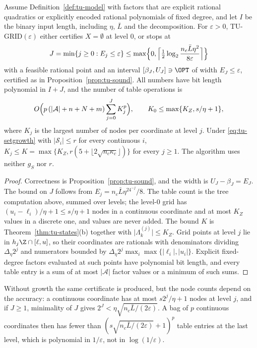 \begin{theorem}\label{thm:tu-approx}
Assume Definition~\ref{def:tu-model} with factors that are explicit rational
quadratics or explicitly encoded rational polynomials of fixed degree, and
let $I$ be the binary input length, including $\eta$, $\bar L$ and the
decomposition. For $\varepsilon>0$, TU-GRID$(\varepsilon)$ either certifies
$X=\emptyset$ at level $0$, or stops at
\[
J=\min\{j\ge0:E_j\le\varepsilon\}\le
\max\Bigl\{0,\Bigl\lceil\tfrac12\log_2\frac{n_c\bar L\eta^2}{8\varepsilon}\Bigr\rceil\Bigr\}
\]
with a feasible rational point and an interval $[\beta_J,U_J]\ni\OPT$ of width
$E_J\le\varepsilon$, certified as in Proposition~\ref{prop:tu-sound}. All
numbers have bit length polynomial in $I+J$, and the number of table
operations is
\[
O\Bigl(p\,(\lvert\mathcal A\rvert+n+N+m)\sum_{j=0}^JK_j^p\Bigr),\qquad
K_0\le\max\{K_Z,s/\eta+1\},
\]
where $K_j$ is the largest number of nodes per coordinate at level $j$.
Under \eqref{eq:tu-setgrowth} with $\lvert\mathcal S_i\rvert\le r$ for every
continuous $i$, $K_j\le K=\max\{K_Z,r(5+\lfloor2\sqrt{n_c\kappa_c}\rfloor)\}$
for every $j\ge1$. The algorithm uses neither $g_S$ nor $r$.
\end{theorem}

\begin{proof}
Correctness is Proposition~\ref{prop:tu-sound}, and the width is
$U_J-\beta_J=E_J$. The bound on $J$ follows from $E_j=n_c\bar L\eta^24^{-j}/8$.
The table count is the tree computation above, summed over levels; the
level-$0$ grid has $(u_i-\ell_i)/\eta+1\le s/\eta+1$ nodes in a continuous
coordinate and at most $K_Z$ values in a discrete one, and values are never
added. The bound $K$ is Theorem~\ref{thm:tu-states}(b) together with
$\lvert\Lambda^{(j)}_k\rvert\le K_Z$. Grid points at level $j$ lie in
$h_j\Z\cap[\ell,u]$, so their coordinates are rationals with denominators
dividing $\Delta_\eta2^j$ and numerators bounded by
$\Delta_\eta2^j\max_i\max\{\lvert\ell_i\rvert,\lvert u_i\rvert\}$. Explicit
fixed-degree factors evaluated at such points have polynomial bit length,
and every table entry is a sum of at most $\lvert\mathcal A\rvert$ factor
values or a minimum of such sums.
\end{proof}

Without growth the same certificate is produced, but the node counts depend
on the accuracy: a continuous coordinate has at most $s2^j/\eta+1$ nodes at
level $j$, and if $J\ge1$, minimality of $J$ gives
$2^J<\eta\sqrt{n_c\bar L/(2\varepsilon)}$. A bag of $p$ continuous
coordinates then has fewer than $(s\sqrt{n_c\bar L/(2\varepsilon)}+1)^p$
table entries at the last level, which is polynomial in $1/\varepsilon$, not
in $\log(1/\varepsilon)$.

